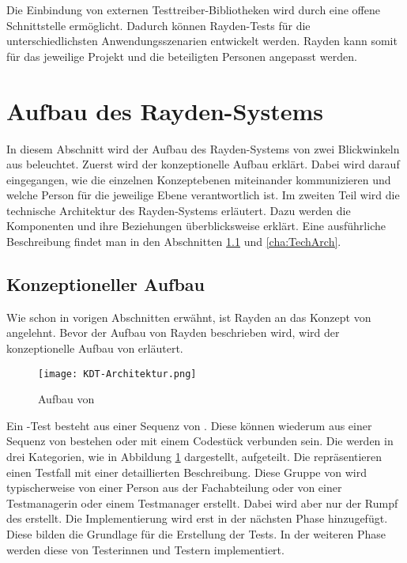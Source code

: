 \SuperPar
Die Einbindung von externen Testtreiber-Bibliotheken wird durch eine offene Schnittstelle ermöglicht. Dadurch können Rayden-Tests für die unterschiedlichsten Anwendungsszenarien entwickelt werden. Rayden kann somit für das jeweilige Projekt und die beteiligten Personen angepasst werden. 


\section{Aufbau des Rayden-Systems}

In diesem Abschnitt wird der Aufbau des Rayden-Systems von zwei Blickwinkeln aus beleuchtet. Zuerst wird der konzeptionelle Aufbau erklärt. Dabei wird darauf eingegangen, wie die einzelnen Konzeptebenen miteinander kommunizieren und welche Person für die jeweilige Ebene verantwortlich ist. Im zweiten Teil wird die technische Architektur des Rayden-Systems erläutert. Dazu werden die Komponenten und ihre Beziehungen überblicksweise erklärt. Eine ausführliche Beschreibung findet man in den Abschnitten \ref{cha:KonzeptAufbau} und \ref{cha:TechArch}.

\subsection{Konzeptioneller Aufbau}
\label{cha:KonzeptAufbau}

Wie schon in vorigen Abschnitten erwähnt, ist Rayden an das Konzept von  angelehnt. Bevor der Aufbau von Rayden beschrieben wird, wird der konzeptionelle Aufbau von  erläutert. 

\begin{figure}[h]
\centering
\texttt{[image: KDT-Architektur.png]}
\caption{Aufbau von }
\label{fig:kdt-arch}
\end{figure}

\SuperPar
Ein -Test besteht aus einer Sequenz von . Diese  können wiederum aus einer Sequenz von  bestehen oder mit einem Codestück verbunden sein. Die  werden in drei Kategorien, wie in Abbildung \ref{fig:kdt-arch} dargestellt, aufgeteilt. Die  repräsentieren einen Testfall mit einer detaillierten Beschreibung. Diese Gruppe von  wird typischerweise von einer Person aus der Fachabteilung oder von einer Testmanagerin oder einem Testmanager erstellt. Dabei wird aber nur der Rumpf des  erstellt. Die Implementierung wird erst in der nächsten Phase hinzugefügt. Diese  bilden die Grundlage für die Erstellung der Tests. In der weiteren Phase werden diese  von Testerinnen und Testern implementiert.

